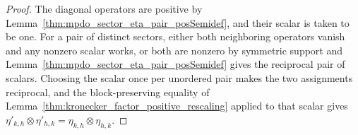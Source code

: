 \begin{proof}
    \leanok
    The diagonal operators are positive by
    Lemma~\ref{thm:mpdo_sector_eta_pair_posSemidef}, and their scalar is
    taken to be one. For a pair of distinct sectors, either both
    neighboring operators vanish and any nonzero scalar works, or both are
    nonzero by symmetric support and
    Lemma~\ref{thm:mpdo_sector_eta_pair_posSemidef} gives the
    reciprocal pair of scalars. Choosing the scalar once per unordered
    pair makes the two assignments reciprocal, and the block-preserving
    equality of Lemma~\ref{thm:kronecker_factor_positive_rescaling}
    applied to that scalar gives
    $\eta'_{k,h}\otimes\eta'_{h,k}=\eta_{k,h}\otimes\eta_{h,k}$.
\end{proof}
